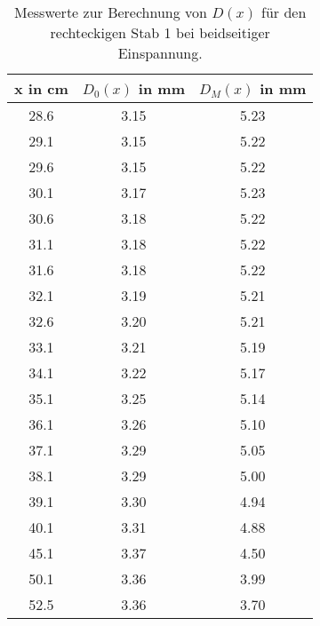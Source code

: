 \begin{table}
  \centering
  \begin{tabular}{c c c}
    \toprule
    x in \si{\centi\meter} & $D_0(x)$ in \si{\milli\meter} & $D_M(x)$ in \si{\milli\meter} \\
    \midrule
    28.6 & 3.15 & 5.23 \\
    29.1 & 3.15 & 5.22 \\
    29.6 & 3.15 & 5.22 \\
    30.1 & 3.17 & 5.23 \\
    30.6 & 3.18 & 5.22 \\
    31.1 & 3.18 & 5.22 \\
    31.6 & 3.18 & 5.22 \\
    32.1 & 3.19 & 5.21 \\
    32.6 & 3.20 & 5.21 \\
    33.1 & 3.21 & 5.19 \\
    34.1 & 3.22 & 5.17 \\
    35.1 & 3.25 & 5.14 \\
    36.1 & 3.26 & 5.10 \\
    37.1 & 3.29 & 5.05 \\
    38.1 & 3.29 & 5.00 \\
    39.1 & 3.30 & 4.94 \\
    40.1 & 3.31 & 4.88 \\
    45.1 & 3.37 & 4.50 \\
    50.1 & 3.36 & 3.99 \\
    52.5 & 3.36 & 3.70 \\
    \bottomrule
  \end{tabular}
  \caption{Messwerte zur Berechnung von $D(x)$ für den rechteckigen Stab 1 bei
  beidseitiger Einspannung.}
  \label{tab:messung3b}
\end{table}
